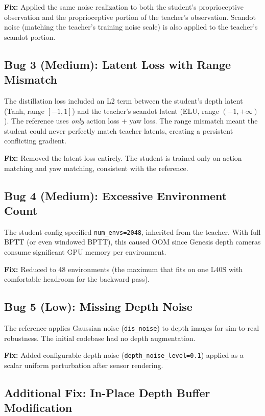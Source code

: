 \documentclass[11pt,a4paper]{article}
\begin{document}
\textbf{Fix:} Applied the same noise realization to both the student's
proprioceptive observation and the proprioceptive portion of the teacher's
observation. Scandot noise (matching the teacher's training noise scale) is also
applied to the teacher's scandot portion.

\subsection{Bug 3 (Medium): Latent Loss with Range Mismatch}

The distillation loss included an L2 term between the student's depth latent
(Tanh, range $[-1,1]$) and the teacher's scandot latent (ELU, range
$(-1,+\infty)$). The reference uses \emph{only} action loss + yaw loss. The
range mismatch meant the student could never perfectly match teacher latents,
creating a persistent conflicting gradient.

\textbf{Fix:} Removed the latent loss entirely. The student is trained only on
action matching and yaw matching, consistent with the reference.

\subsection{Bug 4 (Medium): Excessive Environment Count}

The student config specified \texttt{num\_envs=2048}, inherited from the teacher.
With full BPTT (or even windowed BPTT), this caused OOM since Genesis depth
cameras consume significant GPU memory per environment.

\textbf{Fix:} Reduced to 48 environments (the maximum that fits on one L40S
with comfortable headroom for the backward pass).

\subsection{Bug 5 (Low): Missing Depth Noise}

The reference applies Gaussian noise (\texttt{dis\_noise}) to depth images for
sim-to-real robustness. The initial codebase had no depth augmentation.

\textbf{Fix:} Added configurable depth noise (\texttt{depth\_noise\_level=0.1})
applied as a scalar uniform perturbation after sensor rendering.

\subsection{Additional Fix: In-Place Depth Buffer Modification}
\end{document}
